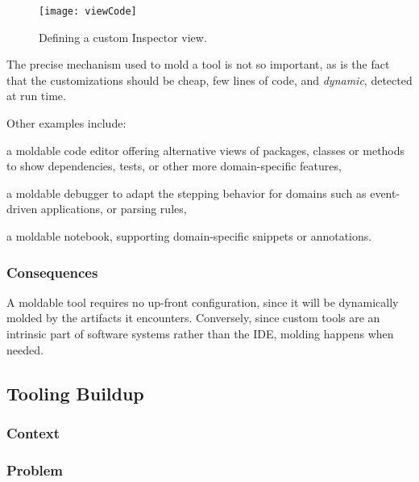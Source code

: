 \documentclass[sigconf]{acmart}
\begin{document}
\begin{figure}[h]
  \texttt{[image: viewCode]}
  \caption{Defining a custom Inspector view.}
  \label{fig:viewCode}
\end{figure}

The precise mechanism used to mold a tool is not so important, as is the fact that the customizations should be cheap, \ie few lines of code, and \emph{dynamic}, \ie detected at run time.

Other examples include:
\begin{inparaenum}[(i)]
\item a moldable code editor offering alternative views of packages, classes or methods to show dependencies, tests, or other more domain-specific features,
\item a moldable debugger to adapt the stepping behavior for domains such as event-driven applications, or parsing rules,
\item a moldable notebook, supporting domain-specific snippets or annotations.
\end{inparaenum}

\subsubsection*{Consequences}
A moldable tool requires no up-front configuration, since it will be dynamically molded by the artifacts it encounters.
Conversely, since custom tools are an intrinsic part of software systems rather than the IDE, molding happens when needed.

\subsection*{Tooling Buildup}\label{pat:toolingBuildup}
\subsubsection*{Context}
\subsubsection*{Problem}
\end{document}
